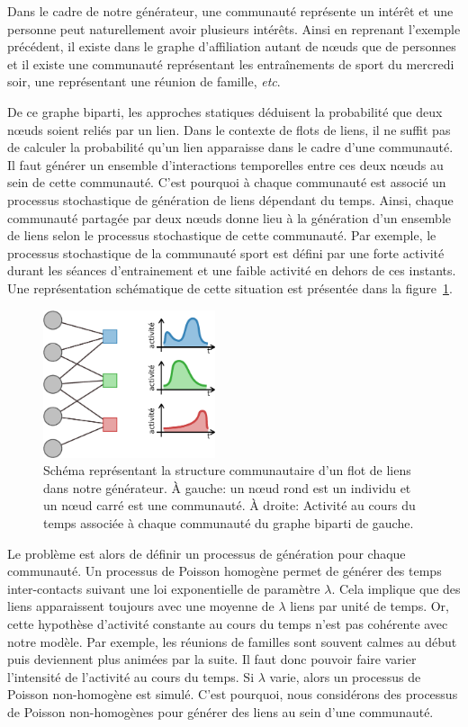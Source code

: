 Dans le cadre de notre générateur, une communauté représente un intérêt et une personne peut naturellement avoir plusieurs intérêts.
Ainsi en reprenant l'exemple précédent, il existe dans le graphe d'affiliation autant de n\oe uds que de personnes et il existe une communauté représentant les entraînements de sport du mercredi soir, une représentant une réunion de famille, \emph{etc}.

De ce graphe biparti, les approches statiques déduisent la probabilité que deux n\oe uds soient reliés par un lien.
Dans le contexte de flots de liens, il ne suffit pas de calculer la probabilité qu'un lien apparaisse dans le cadre d'une communauté.
Il faut générer un ensemble d'interactions temporelles entre ces deux n\oe uds au sein de cette communauté.
C'est pourquoi à chaque communauté est associé un processus stochastique de génération de liens dépendant du temps.
Ainsi, chaque communauté partagée par deux n\oe uds donne lieu à la génération d'un ensemble de liens selon le processus stochastique de cette communauté.
Par exemple, le processus stochastique de la communauté sport est défini par une forte activité durant les séances d'entrainement et une faible activité en dehors de ces instants.
Une représentation schématique de cette situation est présentée dans la figure~\ref{fig:qualite_Generator}.



\begin{figure}
\centering
\includegraphics[width=0.45\textwidth]{img/Qualite/Generator}
\caption{Schéma représentant la structure communautaire d'un flot de liens dans notre générateur.
\`A gauche: un n\oe ud rond est un individu et un n\oe ud carré est une communauté.
\`A droite: Activité au cours du temps associée à chaque communauté du graphe biparti de gauche.}
\label{fig:qualite_Generator}
\end{figure}

Le problème est alors de définir un processus de génération pour chaque communauté.
Un processus de Poisson homogène permet de générer des temps inter-contacts suivant une loi exponentielle de paramètre $\lambda$.
Cela implique que des liens apparaissent toujours avec une moyenne de $\lambda$ liens par unité de temps.
Or, cette hypothèse d'activité constante au cours du temps n'est pas cohérente avec notre modèle.
Par exemple, les réunions de familles sont souvent calmes au début puis deviennent plus animées par la suite.
Il faut donc pouvoir faire varier l'intensité de l'activité au cours du temps.
Si $\lambda$ varie, alors un processus de Poisson non-homogène est simulé.
C'est pourquoi, nous considérons des processus de Poisson non-homogènes pour générer des liens au sein d'une communauté.

